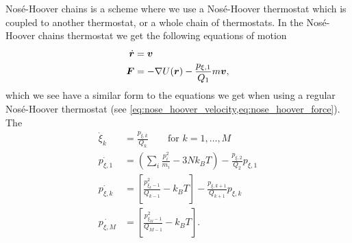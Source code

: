 Nosé-Hoover chains is a scheme where we use a Nosé-Hoover thermostat which is coupled to another thermostat, or a whole chain of thermostats. In the Nosé-Hoover chains thermostat\cite{martyna1992nose} we get the following equations of motion
\begin{align*}
    \dot{\boldsymbol{r}} &= \boldsymbol{v} \\
    \boldsymbol{F} &= -\nabla U(\boldsymbol{r}) - \frac{p_{\xi,1}}{Q_1}m\boldsymbol{v},
\end{align*}
which we see have a similar form to the equations we get when using a regular Nosé-Hoover thermostat (see \cref{eq:nose_hoover_velocity,eq:nose_hoover_force}). The 
\begin{align*}
    \dot \xi_k &= \frac{p_{\xi,k}}{Q_k} \qquad\text{for } k = 1,\dots,M \\
    \dot{p_{\xi,1}} &= \left( \sum_i \frac{p_i^2}{m_i} - 3Nk_BT \right) - \frac{p_{\xi,2}}{Q_2} p_{\xi,1} \\
    \dot{p_{\xi,k}} &= \left[ \frac{p_{\xi_k-1}^2}{Q_{k-1}} - k_BT \right] - \frac{p_{\xi,k+1}}{Q_{k+1}}p_{\xi,k} \\
    \dot{p_{\xi,M}} &= \left[ \frac{p_{\xi_M-1}^2}{Q_{M-1}} - k_BT \right].
\end{align*}




